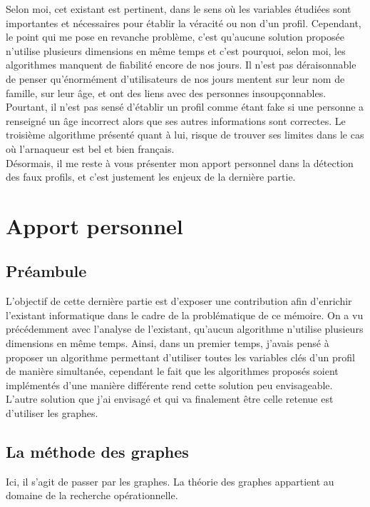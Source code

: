 \documentclass[12pt]{report}
\begin{document}
Selon moi, cet existant est pertinent, dans le sens où les variables étudiées sont importantes et nécessaires pour établir la véracité ou non d'un profil. Cependant, le point qui me pose en revanche problème, c'est qu'aucune solution proposée n'utilise plusieurs dimensions en même temps et c'est pourquoi, selon moi, les algorithmes manquent de fiabilité encore de nos jours. Il n'est pas déraisonnable de penser qu'énormément d'utilisateurs de nos jours mentent sur leur nom de famille, sur leur âge, et ont des liens avec des personnes insoupçonnables. Pourtant, il n'est pas sensé d'établir un profil comme étant fake si une personne a renseigné un âge incorrect alors que ses autres informations sont correctes. Le troisième algorithme présenté quant à lui, risque de trouver ses limites dans le cas où l'arnaqueur est bel et bien français. \\

Désormais, il me reste à vous présenter mon apport personnel dans la détection des faux profils, et c'est justement les enjeux de la dernière partie.

\chapter{Apport personnel}
\section{Préambule}
L'objectif de cette dernière partie est d'exposer une contribution afin d'enrichir l'existant informatique dans le cadre de la problématique de ce mémoire. On a vu précédemment avec l'analyse de l'existant, qu'aucun algorithme n'utilise plusieurs dimensions en même temps. Ainsi, dans un premier temps, j'avais pensé à proposer un algorithme permettant d'utiliser toutes les variables clés d'un profil de manière simultanée, cependant le fait que les algorithmes proposés soient implémentés d'une manière différente rend cette solution peu envisageable. \\

L'autre solution que j'ai envisagé et qui va finalement être celle retenue est d'utiliser les graphes.

\section{La méthode des graphes}
Ici, il s'agit de passer par les graphes. La théorie des graphes appartient au domaine de la recherche opérationnelle. \\
\end{document}
